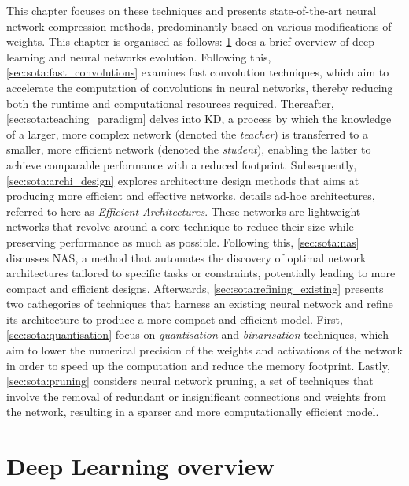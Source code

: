 This chapter focuses on these techniques and presents state-of-the-art neural
network compression methods, predominantly based on various modifications of
weights. This chapter is organised as follows: \cref{sec:sota:dl_overview} does
a brief overview of deep learning and neural networks evolution. Following this,
\cref{sec:sota:fast_convolutions} examines fast convolution techniques, which
aim to accelerate the computation of convolutions in neural networks, thereby
reducing both the runtime and computational resources required. Thereafter,
\cref{sec:sota:teaching_paradigm} delves into \ac{KD}, a process by which the
knowledge of a larger, more complex network (denoted the \emph{teacher}) is
transferred to a smaller, more efficient network (denoted the \emph{student}),
enabling the latter to achieve comparable performance with a reduced footprint.
Subsequently, \cref{sec:sota:archi_design} explores architecture design methods
that aims at producing more efficient and effective networks.
 details ad-hoc architectures, referred to here
as \emph{Efficient Architectures}. These networks are lightweight networks that
revolve around a core technique to reduce their size while preserving
performance as much as possible. Following this, \cref{sec:sota:nas} discusses
\ac{NAS}, a method that automates the discovery of optimal network architectures
tailored to specific tasks or constraints, potentially leading to more compact
and efficient designs. Afterwards, \cref{sec:sota:refining_existing} presents
two cathegories of techniques that harness an existing neural network and refine
its architecture to produce a more compact and efficient model. First,
\cref{sec:sota:quantisation} focus on \emph{quantisation} and
\emph{binarisation} techniques, which aim to lower the numerical precision of
the weights and activations of the network in order to speed up the computation
and reduce the memory footprint. Lastly, \cref{sec:sota:pruning} considers
neural network pruning, a set of techniques that involve the removal of
redundant or insignificant connections and weights from the network, resulting
in a sparser and more computationally efficient model.\\


\section{Deep Learning overview}\label{sec:sota:dl_overview}

